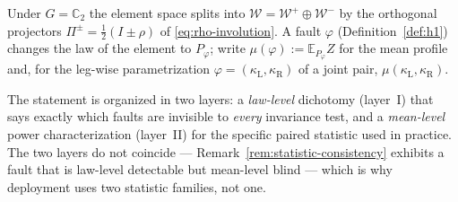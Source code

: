 Under $G = \mathbb{C}_2$ the element space splits into $\mathcal{W} =
\mathcal{W}^+ \oplus \mathcal{W}^-$ by the orthogonal projectors $\Pi^\pm =
\tfrac12(I \pm \rho)$ of \eqref{eq:rho-involution}. A fault
$\varphi$ (Definition~\ref{def:h1}) changes the law of the element to
$P_\varphi$; write $\mu(\varphi) := \mathbb{E}_{P_\varphi} Z$ for the mean
profile and, for the leg-wise parametrization $\varphi = (\kappa_{\mathrm{L}},
\kappa_{\mathrm{R}})$ of a joint pair, $\mu(\kappa_{\mathrm{L}}, \kappa_{\mathrm{R}})$.

The statement is organized in two layers: a \emph{law-level} dichotomy
(layer~I) that says exactly which faults are invisible to \emph{every}
invariance test, and a \emph{mean-level} power characterization (layer~II)
for the specific paired statistic used in practice. The two layers do not
coincide --- Remark~\ref{rem:statistic-consistency} exhibits a fault that is
law-level detectable but mean-level blind --- which is why deployment uses
two statistic families, not one.

